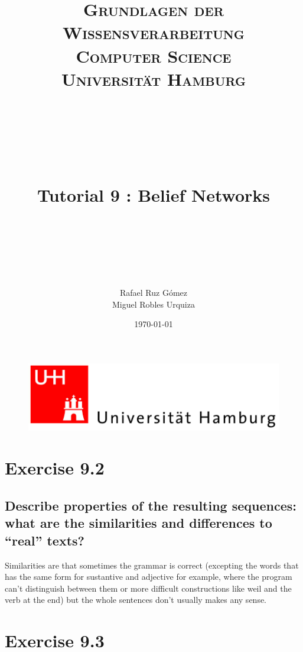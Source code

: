 \documentclass[paper=a4, fontsize=11pt]{scrartcl} %
\title{	
\normalfont \normalsize 
\textsc{\textbf{Grundlagen der Wissensverarbeitung} \\ Computer Science \\ Universität Hamburg} \\ [25pt] %
~\\
~\\
~\\
\horrule{0.5pt} \\[0.4cm] %
\Huge Tutorial 9 : Belief Networks\\ %
\horrule{2pt} \\[0.5cm] %
~\\
~\\
}
\author{Rafael Ruz Gómez\\Miguel Robles Urquiza} %
\date{\normalsize \today} %
\numberwithin{equation}{section} %
\numberwithin{figure}{section} %
\numberwithin{table}{section} %
\begin{document}
\maketitle %

\begin{figure}
	\centering
	\includegraphics[scale=0.8]{logo_uni_hamburg.png}
\end{figure}

\newpage %





\section*{Exercise 9.2}

\subsection*{Describe properties of the resulting sequences: what are the similarities and differences to “real” texts?}

Similarities are that sometimes the grammar is correct (excepting the words that has the same form for sustantive and adjective for example, where the program can't distinguish between them or more difficult constructions like weil and the verb at the end) but the whole sentences don't usually makes any sense.




\section*{Exercise 9.3}
\end{document}
